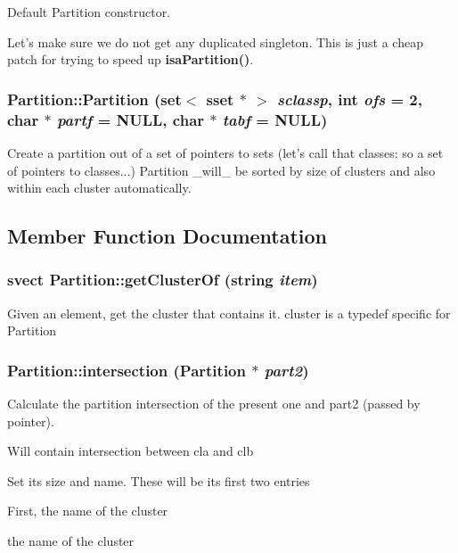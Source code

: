 Default Partition constructor. 

Let's make sure we do not get any duplicated singleton. This is just a cheap patch for trying to speed up {\bf isa\-Partition()}. 
\subsubsection{\setlength{\rightskip}{0pt plus 5cm}Partition::Partition (set$<$ sset $\ast$ $>$ {\em sclassp}, int {\em ofs} = 2, char $\ast$ {\em partf} = NULL, char $\ast$ {\em tabf} = NULL)}\label{classPartition_a3}


Create a partition out of a set of pointers to sets (let's call that classes: so a set of pointers to classes...) Partition \_\-will\_\- be sorted by size of clusters and also within each cluster automatically. 

\subsection{Member Function Documentation}
\subsubsection{\setlength{\rightskip}{0pt plus 5cm}svect Partition::get\-Cluster\-Of (string {\em item})}\label{classPartition_a51}


Given an element, get the cluster that contains it. cluster is a typedef specific for Partition 
\subsubsection{ Partition::intersection ({\bf Partition} $\ast$ {\em part2})}\label{classPartition_a61}


Calculate the partition intersection of the present one and part2 (passed by pointer). 

Will contain intersection between cla and clb

Set its size and name. These will be its first two entries

First, the name of the cluster

the name of the cluster

